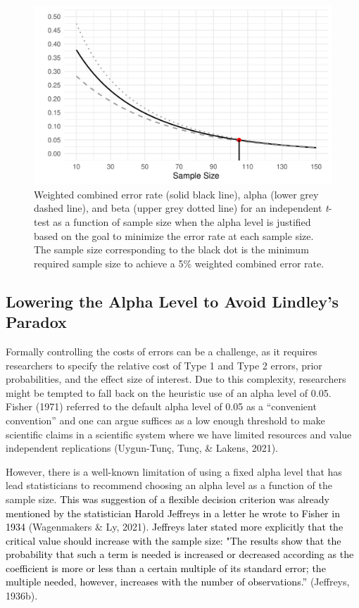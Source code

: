 \documentclass[
  english,
  ,man, a4paper,floatsintext]{apa6}
\begin{document}
\begin{figure}
\centering
\includegraphics{Justify_in_Practice_files/figure-latex/error-plot-1.pdf}
\caption{\label{fig:error-plot}Weighted combined error rate (solid black line), alpha (lower grey dashed line), and beta (upper grey dotted line) for an independent \emph{t}-test as a function of sample size when the alpha level is justified based on the goal to minimize the error rate at each sample size. The sample size corresponding to the black dot is the minimum required sample size to achieve a 5\% weighted combined error rate.}
\end{figure}

\hypertarget{lowering-the-alpha-level-to-avoid-lindleys-paradox}{%
\subsection{Lowering the Alpha Level to Avoid Lindley's Paradox}\label{lowering-the-alpha-level-to-avoid-lindleys-paradox}}

Formally controlling the costs of errors can be a challenge, as it requires researchers to specify the relative cost of Type 1 and Type 2 errors, prior probabilities, and the effect size of interest. Due to this complexity, researchers might be tempted to fall back on the heuristic use of an alpha level of 0.05. Fisher (1971) referred to the default alpha level of 0.05 as a ``convenient convention'' and one can argue suffices as a low enough threshold to make scientific claims in a scientific system where we have limited resources and value independent replications (Uygun-Tunç, Tunç, \& Lakens, 2021).

However, there is a well-known limitation of using a fixed alpha level that has lead statisticians to recommend choosing an alpha level as a function of the sample size.
\textcolor{black}{This was suggestion of a flexible decision criterion was already mentioned by the statistician Harold Jeffreys in a letter he wrote to Fisher in 1934} (Wagenmakers \& Ly, 2021). \textcolor{black}{Jeffreys later stated more explicitly that the critical value should increase with the sample size: "The results show that the probability that such a term is needed is increased or decreased according as the coefficient is more or less than a certain multiple of its standard error; the multiple needed, however, increases with the number of observations.”} (Jeffreys, 1936b).
\end{document}
